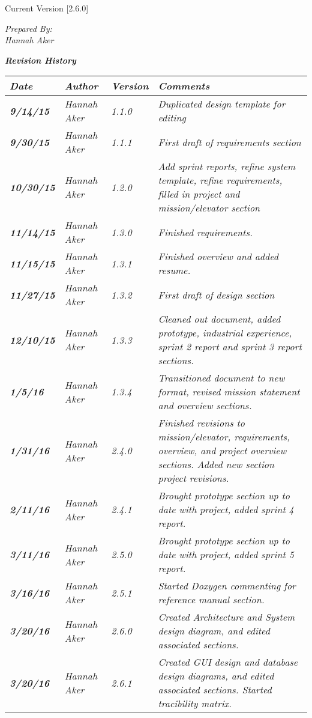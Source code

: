 


Current Version [2.6.0]
\vspace*{5mm}

{\color{SDColor5}
\noindent
\textit{Prepared By:}\\
\textit{Hannah Aker}
}

\vfill
\noindent
{ \textit{\textbf{Revision History}}}\\
\begin{tabular}{|>{\raggedright}p{1.5cm}|>{\raggedright}p{3cm}|>{\raggedright}p{1.5cm}|>{\raggedright}p{9cm}|}
\hline
\textit{\textbf{Date}} &  \textit{\textbf{Author}} & \textit{\textbf{Version}} & \textit{\textbf{Comments}}\tabularnewline
\hline
 \textit{\textbf{9/14/15}} & \textit{Hannah Aker} & \textit{1.1.0} & \textit{Duplicated design template for editing}\tabularnewline
\hline
 \textit{\textbf{9/30/15}} & \textit{Hannah Aker} & \textit{1.1.1} & \textit{First draft of requirements section}\tabularnewline
 \hline
  \textit{\textbf{10/30/15}} & \textit{Hannah Aker} & \textit{1.2.0} & \textit{Add sprint reports, refine system template, refine requirements, filled in project and mission/elevator section}\tabularnewline
\hline
 \textit{\textbf{11/14/15}} & \textit{Hannah Aker} & \textit{1.3.0} & \textit{Finished requirements.}\tabularnewline
\hline
 \textit{\textbf{11/15/15}} & \textit{Hannah Aker} & \textit{1.3.1} & \textit{Finished overview and added resume.}\tabularnewline
\hline
 \textit{\textbf{11/27/15}} & \textit{Hannah Aker} & \textit{1.3.2} & \textit{First draft of design section}\tabularnewline
\hline
 \textit{\textbf{12/10/15}} & \textit{Hannah Aker} & \textit{1.3.3} & \textit{Cleaned out document, added prototype, industrial experience, sprint 2 report and sprint 3 report sections.}\tabularnewline
\hline
 \textit{\textbf{1/5/16}} & \textit{Hannah Aker} & \textit{1.3.4} & \textit{Transitioned document to new format, revised mission statement and overview sections.}\tabularnewline
\hline
 \textit{\textbf{1/31/16}} & \textit{Hannah Aker} & \textit{2.4.0} & \textit{Finished revisions to mission/elevator, requirements, overview, and project overview sections. Added new section project revisions.}\tabularnewline
\hline
 \textit{\textbf{2/11/16}} & \textit{Hannah Aker} & \textit{2.4.1} & \textit{Brought prototype section up to date with project, added sprint 4 report.}\tabularnewline
\hline
 \textit{\textbf{3/11/16}} & \textit{Hannah Aker} & \textit{2.5.0} & \textit{Brought prototype section up to date with project, added sprint 5 report.}\tabularnewline
\hline
 \textit{\textbf{3/16/16}} & \textit{Hannah Aker} & \textit{2.5.1} & \textit{Started Doxygen commenting for reference manual section.}\tabularnewline
\hline
 \textit{\textbf{3/20/16}} & \textit{Hannah Aker} & \textit{2.6.0} & \textit{Created Architecture and System design diagram, and edited associated sections.}\tabularnewline
\hline
 \textit{\textbf{3/20/16}} & \textit{Hannah Aker} & \textit{2.6.1} & \textit{Created GUI design and database design diagrams, and edited associated sections. Started tracibility matrix.}\tabularnewline
\hline
\end{tabular}
\vfill


